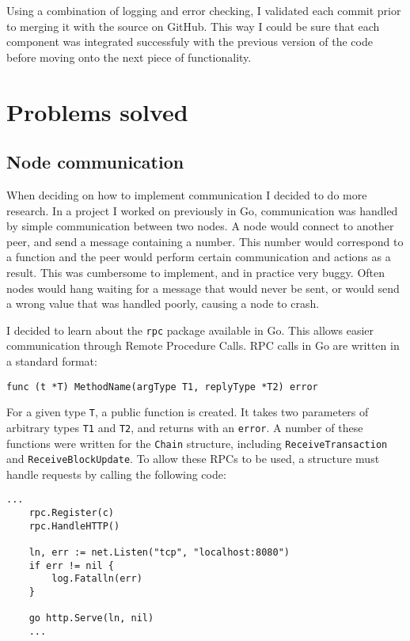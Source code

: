 \documentclass[a4paper,12pt]{article}
\begin{document}
Using a combination of logging and error checking, I validated each commit prior to merging it with the source on GitHub. This way I could be sure that each component was integrated successfuly with the previous version of the code before moving onto the next piece of functionality. 

\section{Problems solved}
\subsection{Node communication}
When deciding on how to implement communication I decided to do more research. In a project I worked on previously in Go, communication was handled by simple communication between two nodes. A node would connect to another peer, and send a message containing a number. This number would correspond to a function and the peer would perform certain communication and actions as a result. This was cumbersome to implement, and in practice very buggy. Often nodes would hang waiting for a message that would never be sent, or would send a wrong value that was handled poorly, causing a node to crash.

I decided to learn about the \verb|rpc| package available in Go. This allows easier communication through Remote Procedure Calls. RPC calls in Go are written in a standard format:
\begin{Verbatim}[obeytabs,tabsize=4]
func (t *T) MethodName(argType T1, replyType *T2) error
\end{Verbatim}

For a given type \verb|T|, a public function is created. It takes two parameters of arbitrary types \verb|T1| and \verb|T2|, and returns with an \verb|error|. A number of these functions were written for the \verb|Chain| structure, including \verb|ReceiveTransaction| and \verb|ReceiveBlockUpdate|. To allow these RPCs to be used, a structure must handle requests by calling the following code:
\begin{Verbatim}[obeytabs,tabsize=4]
    ...
    rpc.Register(c)
	rpc.HandleHTTP()

	ln, err := net.Listen("tcp", "localhost:8080")
	if err != nil {
		log.Fatalln(err)
	}

	go http.Serve(ln, nil)
    ...
\end{Verbatim}
\end{document}
